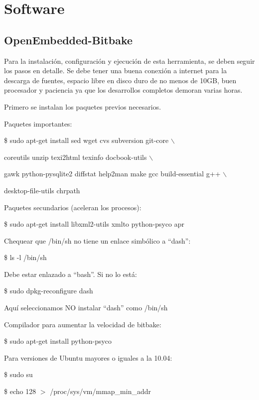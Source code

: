 \chapter{Software}\label{anx_sw}

\section{OpenEmbedded-Bitbake}\label{anx_sw_oe}

Para la instalación, configuración y ejecución de esta herramienta, se deben seguir los pasos en detalle. Se debe tener una buena conexión a internet para la descarga de fuentes, espacio libre en disco duro de no menos de 10GB, buen procesador y paciencia ya que los desarrollos completos demoran varias horas.

\bigskip
Primero se instalan los paquetes previos necesarios. 

\bigskip
Paquetes importantes:

\bigskip
\centerline{\$ sudo apt-get install sed wget cvs subversion git-core $\backslash$}

\centerline{coreutils unzip texi2html texinfo docbook-utils $\backslash$}

\centerline{gawk python-pysqlite2 diffstat help2man make gcc build-essential g++ $\backslash$}

\centerline{desktop-file-utils chrpath}

\bigskip
Paquetes secundarios (aceleran los procesos):

\bigskip
\centerline{\$ sudo apt-get install libxml2-utils xmlto python-psyco apr}

\newpage
Chequear que /bin/sh no tiene un enlace simbólico a “dash”:

\bigskip
\centerline{\$ ls -l /bin/sh}

\bigskip
Debe estar enlazado a “bash”. Si no lo está:

\bigskip
\centerline{\$ sudo dpkg-reconfigure dash}

\bigskip
Aquí seleccionamos NO instalar “dash” como /bin/sh

\bigskip
Compilador para aumentar la velocidad de bitbake:

\bigskip
\centerline{\$ sudo apt-get install python-psyco}

\bigskip
Para versiones de Ubuntu mayores o iguales a la 10.04:

\bigskip
\centerline{\$ sudo su}

\centerline{\$ echo 128 $>$ /proc/sys/vm/mmap\_min\_addr}

